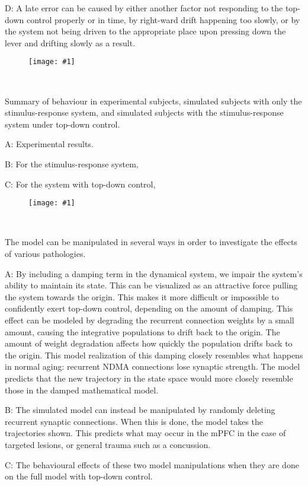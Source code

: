 \documentclass[12pt]{article}
\newcommand{\scalefigone}[3]{
  \begin{figure}[ht!]
    \centering
    \texttt{[image: \#1]}
    \caption{#3}
    \label{#1}
  \end{figure}}
\begin{document}
D: A late error can be caused by either another factor
not responding to the top-down control properly or in time,
by right-ward drift happening too slowly,
or by the system not being driven
to the appropriate place upon pressing down the lever
and drifting slowly as a result.

\clearpage

\scalefigone{f7_behaviour.pdf}{1.0}{~}

Summary of behaviour in experimental subjects,
simulated subjects with only the stimulus-response system,
and simulated subjects with the stimulus-response system
under top-down control.

A: Experimental results.

B: For the stimulus-response system,

C: For the system with top-down control,

\clearpage

\scalefigone{f8_manipulations.pdf}{1.0}{~}

The model can be manipulated in several ways
in order to investigate the effects
of various pathologies.

A: By including a damping term in the dynamical system,
we impair the system's ability to maintain its state.
This can be visualized as an attractive force
pulling the system towards the origin.
This makes it more difficult or impossible
to confidently exert top-down control,
depending on the amount of damping.
This effect can be modeled by degrading
the recurrent connection weights by a small amount,
causing the integrative populations to drift
back to the origin.
The amount of weight degradation affects
how quickly the population drifts back to the origin.
This model realization of this damping
closely resembles what happens in
normal aging: recurrent NDMA connections
lose synaptic strength.
The model predicts that the new trajectory
in the state space would more closely resemble
those in the damped mathematical model.

B: The simulated model can
instead be manipulated by randomly deleting
recurrent synaptic connections.
When this is done,
the model takes the trajectories shown.
This predicts what may occur in the mPFC
in the case of targeted lesions,
or general trauma such as a concussion.

C: The behavioural effects of these two
model manipulations when they are done
on the full model with top-down control.
\end{document}
